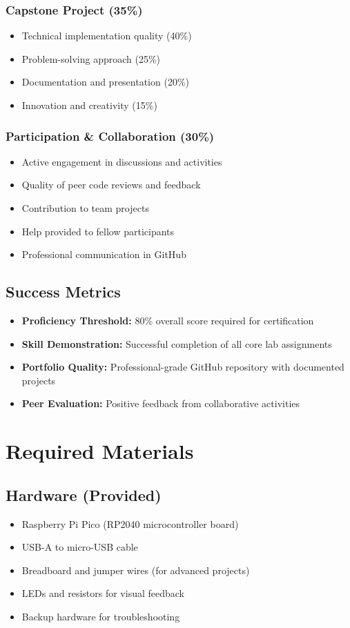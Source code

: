 \documentclass[11pt,a4paper]{article}
\begin{document}
\subsubsection{Capstone Project (35\%)}
\begin{itemize}
    \item Technical implementation quality (40\%)
    \item Problem-solving approach (25\%)
    \item Documentation and presentation (20\%)
    \item Innovation and creativity (15\%)
\end{itemize}

\subsubsection{Participation \& Collaboration (30\%)}
\begin{itemize}
    \item Active engagement in discussions and activities
    \item Quality of peer code reviews and feedback
    \item Contribution to team projects
    \item Help provided to fellow participants
    \item Professional communication in GitHub
\end{itemize}

\subsection{Success Metrics}
\begin{itemize}
    \item \textbf{Proficiency Threshold:} 80\% overall score required for certification
    \item \textbf{Skill Demonstration:} Successful completion of all core lab assignments
    \item \textbf{Portfolio Quality:} Professional-grade GitHub repository with documented projects
    \item \textbf{Peer Evaluation:} Positive feedback from collaborative activities
\end{itemize}

\section{Required Materials}

\subsection{Hardware (Provided)}
\begin{itemize}
    \item Raspberry Pi Pico (RP2040 microcontroller board)
    \item USB-A to micro-USB cable
    \item Breadboard and jumper wires (for advanced projects)
    \item LEDs and resistors for visual feedback
    \item Backup hardware for troubleshooting
\end{itemize}
\end{document}
